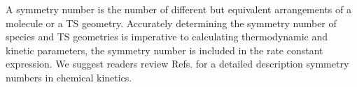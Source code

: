 \documentclass[preprint, 11pt]{elsarticle} %
\begin{document}
A symmetry number is the number of different but equivalent arrangements of a molecule or a TS geometry.
Accurately determining the symmetry number of species and TS geometries is imperative to calculating thermodynamic and kinetic parameters, the symmetry number is included in the rate constant expression. 
We suggest readers review Refs. \cite{FernandezRamos:2007, Pollak:1978} for a detailed description symmetry numbers in chemical kinetics.

\end{document}
